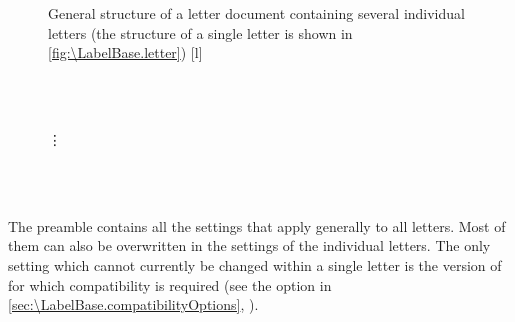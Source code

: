\begin{figure}
  \setcapindent{0pt}%
  \begin{captionbeside}{%
      General structure of a letter document containing several individual letters
      (the structure of a single letter is shown in
      \autoref{fig:\LabelBase.letter})%
      \label{fig:\LabelBase.document}%
    }[l]
    \begin{minipage}[b]{.667\linewidth}
      \centering\small\setlength{\fboxsep}{1.5ex}%
      \addtolength{\linewidth}{-\dimexpr2\fboxrule+2\fboxsep\relax}%
      \\
      \\[2pt]
      \parbox{\linewidth}{\raggedright\vspace{-.5ex}\vdots\vspace{1ex}}\\
      \\[\dimexpr\fboxsep+\fboxrule\relax]
    \end{minipage}
  \end{captionbeside}
\end{figure}

The preamble contains all the settings that apply generally to all letters.
Most of them can also be overwritten in the settings of the individual
letters. The only setting which cannot currently be changed within a single
letter is the version of  for which compatibility is required
(see the  option in
\autoref{sec:\LabelBase.compatibilityOptions},
).

